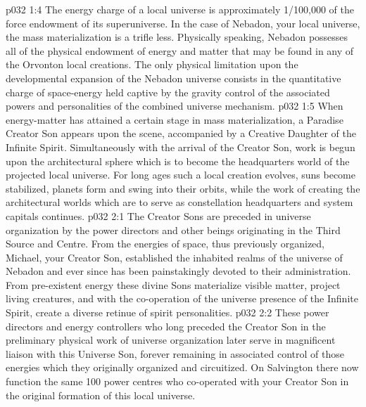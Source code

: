 \vs p032 1:4 The energy charge of a local universe is approximately 1/100,000 of the force endowment of its superuniverse. In the case of Nebadon, your local universe, the mass materialization is a trifle less. Physically speaking, Nebadon possesses all of the physical endowment of energy and matter that may be found in any of the Orvonton local creations. The only physical limitation upon the developmental expansion of the Nebadon universe consists in the quantitative charge of space\hyp{}energy held captive by the gravity control of the associated powers and personalities of the combined universe mechanism.
\vs p032 1:5 \pc When energy\hyp{}matter has attained a certain stage in mass materialization, a Paradise Creator Son appears upon the scene, accompanied by a Creative Daughter of the Infinite Spirit. Simultaneously with the arrival of the Creator Son, work is begun upon the architectural sphere which is to become the headquarters world of the projected local universe. For long ages such a local creation evolves, suns become stabilized, planets form and swing into their orbits, while the work of creating the architectural worlds which are to serve as constellation headquarters and system capitals continues.
\vs p032 2:1 The Creator Sons are preceded in universe organization by the power directors and other beings originating in the Third Source and Centre. From the energies of space, thus previously organized, Michael, your Creator Son, established the inhabited realms of the universe of Nebadon and ever since has been painstakingly devoted to their administration. From pre\hyp{}existent energy these divine Sons materialize visible matter, project living creatures, and with the co\hyp{}operation of the universe presence of the Infinite Spirit, create a diverse retinue of spirit personalities.
\vs p032 2:2 These power directors and energy controllers who long preceded the Creator Son in the preliminary physical work of universe organization later serve in magnificent liaison with this Universe Son, forever remaining in associated control of those energies which they originally organized and circuitized. On Salvington there now function the same 100 power centres who co\hyp{}operated with your Creator Son in the original formation of this local universe.
